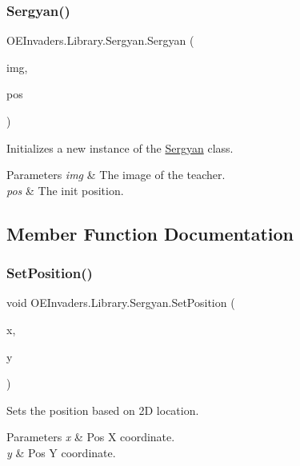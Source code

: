 \subsubsection{\texorpdfstring{Sergyan()}{Sergyan()}}
{\footnotesize\ttfamily O\+E\+Invaders.\+Library.\+Sergyan.\+Sergyan (\begin{DoxyParamCaption}\item[{Bitmap\+Source}]{img,  }\item[{Point}]{pos }\end{DoxyParamCaption})}



Initializes a new instance of the \mbox{\hyperlink{class_o_e_invaders_1_1_library_1_1_sergyan}{Sergyan}} class. 


\begin{DoxyParams}{Parameters}
{\em img} & The image of the teacher.\\
\hline
{\em pos} & The init position.\\
\hline
\end{DoxyParams}


\subsection{Member Function Documentation}
\mbox{\label{class_o_e_invaders_1_1_library_1_1_sergyan_a11889323e2933e197f89f40855bc7257}} 
\subsubsection{\texorpdfstring{SetPosition()}{SetPosition()}}
{\footnotesize\ttfamily void O\+E\+Invaders.\+Library.\+Sergyan.\+Set\+Position (\begin{DoxyParamCaption}\item[{double}]{x,  }\item[{double}]{y }\end{DoxyParamCaption})}



Sets the position based on 2D location. 


\begin{DoxyParams}{Parameters}
{\em x} & Pos X coordinate.\\
\hline
{\em y} & Pos Y coordinate.\\
\hline
\end{DoxyParams}


